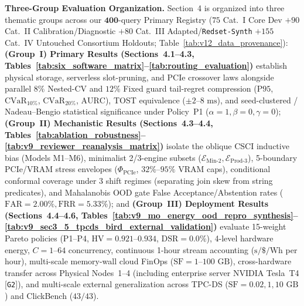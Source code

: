 \documentclass[10pt,a4paper]{article}
\begin{document}
\par\vspace{3pt}\noindent\textbf{Three-Group Evaluation Organization.} Section~4 is organized into three thematic groups across our $\mathbf{400}$-query Primary Registry ($75$ Cat.~I Core Dev $+ 90$ Cat.~II Calibration/Diagnostic $+ 80$ Cat.~III Adapted/\texttt{Redset-Synth} $+ 155$ Cat.~IV Untouched Consortium Holdouts; Table~\ref{tab:v12_data_provenance}): \textbf{(Group~I) Primary Results (Sections~4.1--4.3, Tables~\ref{tab:six_software_matrix}--\ref{tab:routing_evaluation})} establish physical storage, serverless slot-pruning, and PCIe crossover laws alongside parallel $8\%$ Nested-CV and $12\%$ Fixed guard tail-regret compression ($\text{P95}$, $\text{CVaR}_{10\%}$, $\text{CVaR}_{20\%}$, $\text{AURC}$), TOST equivalence ($\pm 2\text{--}8\text{ ms}$), and seed-clustered / Nadeau--Bengio statistical significance under Policy~P1 ($\alpha=1,\beta=0,\gamma=0$); \textbf{(Group~II) Mechanistic Results (Sections~4.3--4.4, Tables~\ref{tab:ablation_robustness}--\ref{tab:v9_reviewer_reanalysis_matrix})} isolate the oblique $\text{CSCI}$ inductive bias (Models M1--M6), minimalist 2/3-engine subsets ($\mathcal{E}_{\text{Min-2}}, \mathcal{E}_{\text{Prod-3}}$), 5-boundary PCIe/VRAM stress envelopes ($\Phi_{\text{PCIe}}$, $32\%\text{--}95\%$ VRAM caps), conditional conformal coverage under 3 shift regimes (separating join skew from string predicates), and Mahalanobis OOD gate False Acceptance/Abstention rates ($\text{FAR}=2.00\%, \text{FRR}=5.33\%$); and \textbf{(Group~III) Deployment Results (Sections~4.4--4.6, Tables~\ref{tab:v9_mo_energy_ood_repro_synthesis}--\ref{tab:v9_sec3_5_tpcds_bird_external_validation})} evaluate 15-weight Pareto policies (P1--P4, $\text{HV}=0.921\text{--}0.934$, $\text{DSR}=0.0\%$), 4-level hardware energy, $C=1\text{--}64$ concurrency, continuous 1-hour stream accounting ($\text{s}/\$/\text{Wh}$ per hour), multi-scale memory-wall cloud FinOps ($\text{SF}=1\text{--}100\text{ GB}$), cross-hardware transfer across Physical Nodes~1--4 (including enterprise server NVIDIA Tesla~T4 [\texttt{G2}]), and multi-scale external generalization across TPC-DS ($\text{SF}=0.02, 1, 10\text{ GB}$) and ClickBench ($43/43$).
\end{document}
